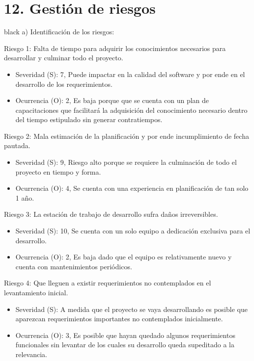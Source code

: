 \documentclass[11pt]{charter}
\begin{document}
\section{12. Gestión de riesgos}
\label{sec:riesgos}

\begin{consigna}{black}
a) Identificación de los riesgos:

Riesgo 1: Falta de tiempo para adquirir los conocimientos necesarios para desarrollar y culminar todo el proyecto.
\begin{itemize}
\item Severidad (S): 7, Puede impactar en la calidad del software y por ende en el desarrollo de los requerimientos.
\item Ocurrencia (O): 2, Es baja porque que se cuenta con un plan de capacitaciones que facilitará la adquisición del conocimiento necesario dentro del tiempo estipulado sin generar contratiempos.
\end{itemize}
		
Riesgo 2: Mala estimación de la planificación y por ende incumplimiento de fecha pautada.
\begin{itemize}
\item Severidad (S): 9, Riesgo alto porque se requiere la culminación de todo el proyecto en tiempo y forma.
\item Ocurrencia (O): 4, Se cuenta con una experiencia en planificación de tan solo 1 año.
\end{itemize}
		
Riesgo 3: La estación de trabajo de desarrollo sufra daños irreversibles.
\begin{itemize}
\item Severidad (S): 10, Se cuenta con un solo equipo a dedicación exclusiva para el desarrollo.
\item Ocurrencia (O): 2, Es baja dado que el equipo es relativamente nuevo y cuenta con mantenimientos periódicos.
\end{itemize}

Riesgo 4: Que lleguen a existir requerimientos no contemplados en el levantamiento inicial.  
\begin{itemize}
\item Severidad (S): A medida que el proyecto se vaya desarrollando es posible que aparezcan requerimientos importantes no contemplados inicialmente.
\item Ocurrencia (O): 3, Es posible que hayan quedado algunos requerimientos funcionales sin levantar de los cuales su desarrollo queda supeditado a la relevancia.
\end{itemize}		


\end{consigna}
\end{document}
